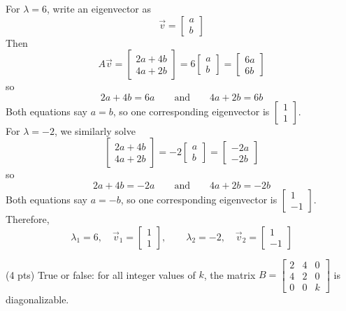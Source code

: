 \documentclass[11pt]{article}
\begin{document}
\begin{prob}[(12 pts)]
\begin{subprob}
\begin{solution}
For $\lambda=6$, write an eigenvector as
\[
\vec{v}=\begin{bmatrix}a\\b\end{bmatrix}
\]
Then
\[
A\vec{v}
=
\begin{bmatrix}
2a+4b\\
4a+2b
\end{bmatrix}
=
6\begin{bmatrix}a\\b\end{bmatrix}
=
\begin{bmatrix}
6a\\
6b
\end{bmatrix}
\]
so
\[
2a+4b=6a
\qquad\text{and}\qquad
4a+2b=6b
\]
Both equations say $a=b$, so one corresponding eigenvector is $\begin{bmatrix}1\\1\end{bmatrix}$. \\

For $\lambda=-2$, we similarly solve
\[
\begin{bmatrix}
2a+4b\\
4a+2b
\end{bmatrix}
=
-2\begin{bmatrix}a\\b\end{bmatrix}
=
\begin{bmatrix}
-2a\\
-2b
\end{bmatrix}
\]
so
\[
2a+4b=-2a
\qquad\text{and}\qquad
4a+2b=-2b
\]
Both equations say $a=-b$, so one corresponding eigenvector is $\begin{bmatrix}1\\-1\end{bmatrix}$. Therefore,
\[
\lambda_1=6,\quad \vec{v}_1=\begin{bmatrix}1\\1\end{bmatrix},
\qquad
\lambda_2=-2,\quad \vec{v}_2=\begin{bmatrix}1\\-1\end{bmatrix}
\]
\end{solution}
\end{subprob}

\begin{subprob}(4 pts) True or false: for all integer values of $k$, the matrix $B=\begin{bmatrix}2&4&0\\4&2&0\\0&0&k\end{bmatrix}$ is diagonalizable.


\end{subprob}
\end{prob}
\end{document}
